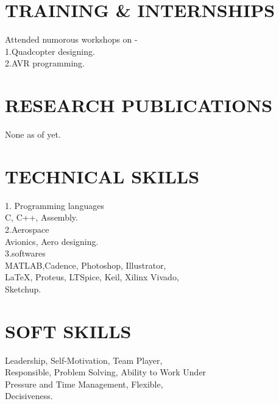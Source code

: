 \documentclass[10pt]{article}
\begin{document}
\raggedright
\section*{\large{TRAINING \& \hspace{8in} INTERNSHIPS}}
\hspace{2in} \large{Attended numorous workshops on -  }\\
\hspace{2.5in} \large{1.Quadcopter designing.}\\
\hspace{2.5in} \large{2.AVR programming.}\\

\raggedright
\section*{\large{RESEARCH \hspace{8in} PUBLICATIONS}}
\hspace{2in} None as of yet.\\

\raggedright
\section*{\large{TECHNICAL \hspace{8in} SKILLS}}
\hspace{2in} \large{1. Programming languages }\\
\hspace{2.5in} \large{C, C++, Assembly.  }\\
\hspace{2in} \large{2.Aerospace }\\
\hspace{2.5in} \large{ Avionics, Aero designing. }\\
\hspace{2in} \large{3.softwares }\\
\hspace{2.5in} \large{MATLAB,Cadence, Photoshop, Illustrator,\\ \hspace{2.5in} LaTeX, Proteus, LTSpice, Keil, Xilinx Vivado,\\\hspace{2.5in}  Sketchup.}\\

\raggedright
\section*{\large{SOFT \hspace{8in} SKILLS}}
\hspace{2in} \large{ Leadership, Self-Motivation, Team Player,\\ \hspace{2.05in} Responsible, Problem Solving, Ability to Work Under\\ \hspace{2.05in} Pressure and Time Management, Flexible,\\\hspace{2.05in} Decisiveness.}\\
\end{document}

